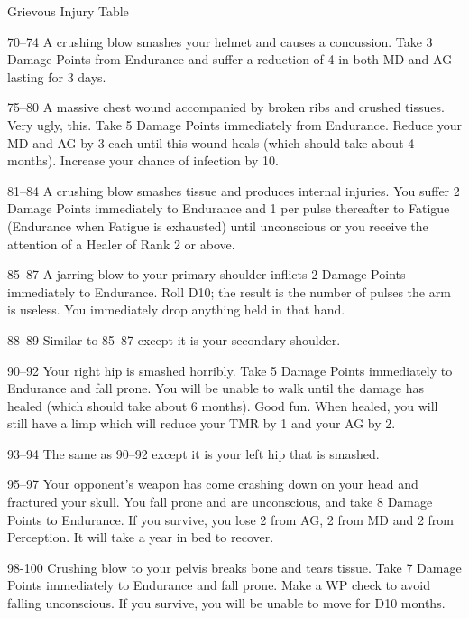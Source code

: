 \begin{Chapter}{Grievous Injury Table}
\begin{Description}
\item[70–74] A crushing blow smashes your helmet and causes a
  concussion. Take 3 Damage Points from Endurance and suffer a
  reduction of 4 in both MD and AG lasting for 3 days.

\item[75–80] A massive chest wound accompanied by broken ribs and
  crushed tissues. Very ugly, this. Take 5 Damage Points immediately
  from Endurance. Reduce your MD and AG by 3 each until this wound
  heals (which should take about 4 months).  Increase your chance of
  infection by 10.

\item[81–84] A crushing blow smashes tissue and produces internal
  injuries. You suffer 2 Damage Points immediately to Endurance and 1
  per pulse thereafter to Fatigue (Endurance when Fatigue is
  exhausted) until unconscious or you receive the attention of a
  Healer of Rank 2 or above.

\item[85–87] A jarring blow to your primary shoulder inflicts 2 Damage
  Points immediately to Endurance. Roll D10; the result is the number
  of pulses the arm is useless. You immediately drop anything held in
  that hand.

\item[88–89] Similar to 85–87 except it is your secondary shoulder.

\item[90–92] Your right hip is smashed horribly. Take 5 Damage Points
  immediately to Endurance and fall prone. You will be unable to walk
  until the damage has healed (which should take about 6 months). Good
  fun.  When healed, you will still have a limp which will reduce your
  TMR by 1 and your AG by 2.

\item[93–94] The same as 90–92 except it is your left hip that is
  smashed.

\item[95–97] Your opponent’s weapon has come crashing down on your
  head and fractured your skull. You fall prone and are unconscious,
  and take 8 Damage Points to Endurance.  If you survive, you lose 2
  from AG, 2 from MD and 2 from Perception. It will take a year in bed
  to recover.

\item[98-100] Crushing blow to your pelvis breaks bone and tears
  tissue. Take 7 Damage Points immediately to Endurance and fall
  prone.  Make a WP check to avoid falling unconscious. If you
  survive, you will be unable to move for D10 months.


\end{Description}
\end{Chapter}

